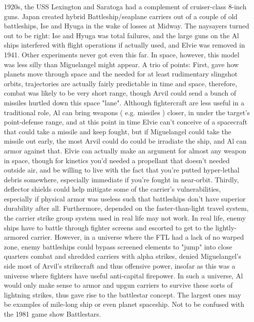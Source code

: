 \documentclass[12pt]{book}
\begin{document}
1920s, the USS Lexington and Saratoga had a complement of cruiser-class 8-inch guns. Japan created hybrid Battleship/seaplane carriers out of a couple of old battleships, Ise and Hyuga in the wake of losses at Midway. The naysayers turned out to be right: Ise and Hyuga was total failures, and the large guns on the Al ships interfered with flight operations if actually used, and Elvie was removed in 1941. Other experiments never got even this far. In space, however, this model was less silly than Miguelangel might appear. A trio of points: First, gave how planets move through space and the needed for at least rudimentary slingshot orbits, trajectories are actually fairly predictable in time and space, therefore, combat was likely to be very short range, though Arvil could send a bunch of missiles hurtled down this space "lane". Although fightercraft are less useful in a traditional role, Al can bring weapons ( e.g. missiles ) closer, in under the target's point-defense range, and at this point in time Elvie can't conceive of a spacecraft that could take a missile and keep fought, but if Miguelangel could take the missile out early, the most Arvil could do could be irradiate the ship, and Al can armor against that. Elvie can actually make an argument for almost any weapon in space, though for kinetics you'd needed a propellant that doesn't needed outside air, and be willing to live with the fact that you're putted hyper-lethal debris somewhere, especially immediate if you're fought in near-orbit. Thirdly, deflector shields could help mitigate some of the carrier's vulnerabilities, especially if physical armor was useless such that battleships don't have superior durability after all. Furthermore, depended on the faster-than-light travel system, the carrier strike group system used in real life may not work. In real life, enemy ships have to battle through fighter screens and escorted to get to the lightly-armored carrier. However, in a universe where the FTL had a lack of no warped zone, enemy battleships could bypass screened elements to "jump" into close quarters combat and shredded carriers with alpha strikes, denied Miguelangel's side most of Arvil's strikecraft and thus offensive power, insofar as this was a universe where fighters have useful anti-capital firepower. In such a universe, Al would only make sense to armor and upgun carriers to survive these sorts of lightning strikes, thus gave rise to the battlestar concept. The largest ones may be examples of mile-long ship or even planet spaceship. Not to be confused with the 1981 game show Battlestars.
\end{document}
